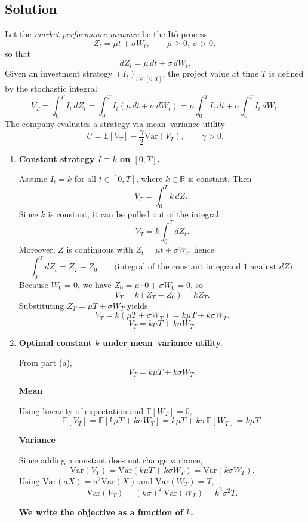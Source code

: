 \documentclass{article}
\begin{document}
\subsection*{Solution}

Let the \emph{market performance measure} be the It\^o process
\[
Z_t=\mu t+\sigma W_t,\qquad \mu\ge 0,\ \sigma>0,
\]
so that
\[
dZ_t=\mu\,dt+\sigma\,dW_t.
\]
Given an investment strategy $(I_t)_{t\in[0,T]}$, the project value at time $T$ is defined by the stochastic integral
\[
V_T=\int_0^T I_t\,dZ_t
=\int_0^T I_t(\mu\,dt+\sigma\,dW_t)
=\mu\int_0^T I_t\,dt+\sigma\int_0^T I_t\,dW_t.
\]
The company evaluates a strategy via mean--variance utility
\[
U=\mathbb{E}[V_T]-\frac{\gamma}{2}\mathrm{Var}(V_T),\qquad \gamma>0.
\]

\begin{enumerate}
\item[(a)] \textbf{Constant strategy $I\equiv k$ on $[0,T]$.}

Assume $I_t=k$ for all $t\in[0,T]$, where $k\in\mathbb{R}$ is constant. Then
\[
V_T=\int_0^T k\,dZ_t.
\]
Since $k$ is constant, it can be pulled out of the integral:
\[
V_T=k\int_0^T dZ_t.
\]
Moreover, $Z$ is continuous with $Z_t=\mu t+\sigma W_t$, hence
\[
\int_0^T dZ_t = Z_T-Z_0
\qquad\text{(integral of the constant integrand $1$ against $dZ$).}
\]
Because $W_0=0$, we have $Z_0=\mu\cdot 0+\sigma W_0=0$, so
\[
V_T=k(Z_T-Z_0)=kZ_T.
\]
Substituting $Z_T=\mu T+\sigma W_T$ yields
\[
V_T=k(\mu T+\sigma W_T)=k\mu T+k\sigma W_T.
\]
\[
\boxed{\,V_T=k\mu T+k\sigma W_T.\,}
\]

\item[(b)] \textbf{Optimal constant $k$ under mean--variance utility.}

From part (a),
\[
V_T=k\mu T+k\sigma W_T.
\]

\medskip
\noindent\textbf{Mean}

Using linearity of expectation and $\mathbb{E}[W_T]=0$,
\[
\mathbb{E}[V_T]=\mathbb{E}[k\mu T+k\sigma W_T]
=k\mu T+k\sigma\,\mathbb{E}[W_T]
=k\mu T.
\]

\medskip
\noindent\textbf{Variance}

Since adding a constant does not change variance,
\[
\mathrm{Var}(V_T)=\mathrm{Var}(k\mu T+k\sigma W_T)=\mathrm{Var}(k\sigma W_T).
\]
Using $\mathrm{Var}(aX)=a^2\mathrm{Var}(X)$ and $\mathrm{Var}(W_T)=T$,
\[
\mathrm{Var}(V_T)=(k\sigma)^2\,\mathrm{Var}(W_T)=k^2\sigma^2T.
\]

\medskip
\noindent\textbf{We write the objective as a function of $k$.}


\end{enumerate}
\end{document}
